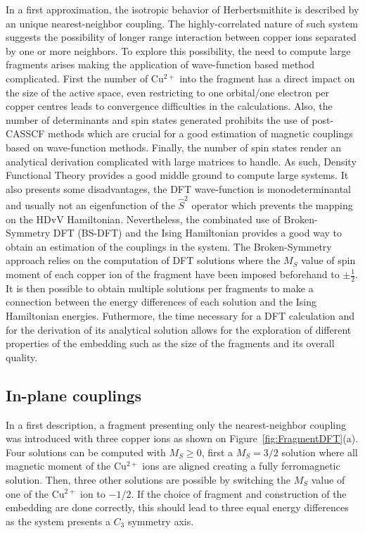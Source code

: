 \documentclass[12pt,a4paper]{report}
\numberwithin{equation}{section}
\begin{document}
In a first approximation, the isotropic behavior of Herbertsmithite is described by an unique nearest-neighbor coupling. 
The highly-correlated nature of such system suggests the possibility of longer range interaction between copper ions separated by one or more neighbors. 
To explore this possibility, the need to compute large fragments arises making the application of wave-function based method complicated.
First the number of Cu$^{2+}$ into the fragment has a direct impact on the size of the active space, even restricting to one orbital/one electron per copper centres leads to convergence difficulties in the calculations.
Also, the number of determinants and spin states generated prohibits the use of post-CASSCF methods which are crucial for a good estimation of magnetic couplings based on wave-function methods.
Finally, the number of spin states render an analytical derivation complicated with large matrices to handle.
As such, Density Functional Theory provides a good middle ground to compute large systems. 
It also presents some disadvantages, the DFT wave-function is monodeterminantal and usually not an eigenfunction of the $\hat{S}^2$ operator which prevents the mapping on the HDvV Hamiltonian.
Nevertheless, the combinated use of Broken-Symmetry DFT (BS-DFT) and the Ising Hamiltonian provides a good way to obtain an estimation of the couplings in the system.
The Broken-Symmetry approach relies on the computation of DFT solutions where the $M_S$ value of spin moment of each copper ion of the fragment have been imposed beforehand to $\pm \frac{1}{2}$. 
It is then possible to obtain multiple solutions per fragments to make a connection between the energy differences of each solution and the Ising Hamiltonian energies.
Futhermore, the time necessary for a DFT calculation and for the derivation of its analytical solution allows for the exploration of different properties of the embedding such as the size of the fragments and its overall quality.


\subsection{In-plane couplings}

In a first description, a fragment presenting only the nearest-neighbor coupling was introduced with three copper ions as shown on Figure~\ref{fig:FragmentDFT}(a).
Four solutions can be computed with $M_S$$\ge$$0$, first a $M_S=3/2$ solution where all magnetic moment of the Cu$^{2+}$ ions are aligned creating a fully ferromagnetic solution. 
Then, three other solutions are possible by switching the $M_S$ value of one of the Cu$^{2+}$ ion to $-1/2$. 
If the choice of fragment and construction of the embedding are done correctly, this should lead to three equal energy differences as the system presents a $C_3$ symmetry axis.
\end{document}
